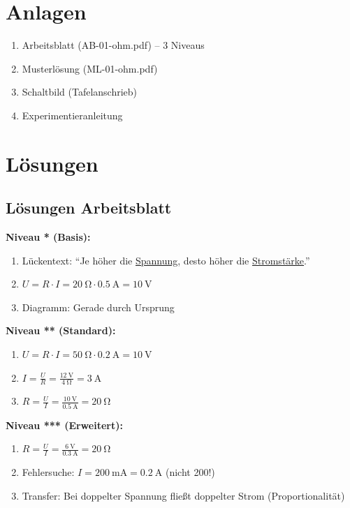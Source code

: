 \documentclass[11pt,a4paper]{article}
\begin{document}
\section{Anlagen}

\begin{enumerate}
    \item Arbeitsblatt (AB-01-ohm.pdf) -- 3 Niveaus
    \item Musterlösung (ML-01-ohm.pdf)
    \item Schaltbild (Tafelanschrieb)
    \item Experimentieranleitung
\end{enumerate}

\section{Lösungen}

\subsection{Lösungen Arbeitsblatt}

\textbf{Niveau * (Basis):}
\begin{enumerate}
    \item Lückentext: ``Je höher die \underline{Spannung}, desto höher die \underline{Stromstärke}.''
    \item $U = R \cdot I = \SI{20}{\ohm} \cdot \SI{0,5}{\ampere} = \SI{10}{\volt}$
    \item Diagramm: Gerade durch Ursprung
\end{enumerate}

\textbf{Niveau ** (Standard):}
\begin{enumerate}
    \item $U = R \cdot I = \SI{50}{\ohm} \cdot \SI{0,2}{\ampere} = \SI{10}{\volt}$
    \item $I = \frac{U}{R} = \frac{\SI{12}{\volt}}{\SI{4}{\ohm}} = \SI{3}{\ampere}$
    \item $R = \frac{U}{I} = \frac{\SI{10}{\volt}}{\SI{0,5}{\ampere}} = \SI{20}{\ohm}$
\end{enumerate}

\textbf{Niveau *** (Erweitert):}
\begin{enumerate}
    \item $R = \frac{U}{I} = \frac{\SI{6}{\volt}}{\SI{0,3}{\ampere}} = \SI{20}{\ohm}$
    \item Fehlersuche: $I = \SI{200}{\milli\ampere} = \SI{0,2}{\ampere}$ (nicht 200!)
    \item Transfer: Bei doppelter Spannung fließt doppelter Strom (Proportionalität)
\end{enumerate}
\end{document}
